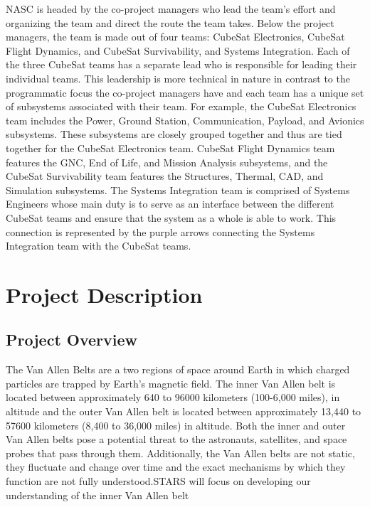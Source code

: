 NASC is headed by the co-project managers who lead the team's effort and organizing the team and direct the route the team takes. Below the project managers, the team is made out of four teams: CubeSat Electronics, CubeSat Flight Dynamics, and CubeSat Survivability, and Systems Integration. Each of the three CubeSat teams has a separate lead who is responsible for leading their individual teams. This leadership is more technical in nature in contrast to the programmatic focus the co-project managers have and each team has a unique set of subsystems associated with their team. For example, the CubeSat Electronics team includes the Power, Ground Station, Communication, Payload, and Avionics subsystems. These subsystems are closely grouped together and thus are tied together for the CubeSat Electronics team. CubeSat Flight Dynamics team features the GNC, End of Life, and Mission Analysis subsystems, and the CubeSat Survivability team features the Structures, Thermal, CAD, and Simulation subsystems. The Systems Integration team is comprised of Systems Engineers whose main duty is to serve as an interface between the different CubeSat teams and ensure that the system as a whole is able to work. This connection is represented by the purple arrows connecting the Systems Integration team with the CubeSat teams. 
\section{Project Description}
\subsection{Project Overview}

The Van Allen Belts are a two regions of space around Earth in which charged particles are trapped by Earth's magnetic field. The inner Van Allen belt is located between approximately 640 to 96000 kilometers (100-6,000 miles), in altitude and the outer Van Allen belt is located between approximately 13,440 to 57600 kilometers (8,400 to 36,000 miles) in altitude. \cite{VanAllen_1} Both the inner and outer Van Allen belts pose a potential threat to the astronauts, satellites, and space probes that pass through them. Additionally, the Van Allen belts are not static, they fluctuate and change over time and the exact mechanisms by which they function are not fully understood.STARS will focus on developing our understanding of the inner Van Allen belt

